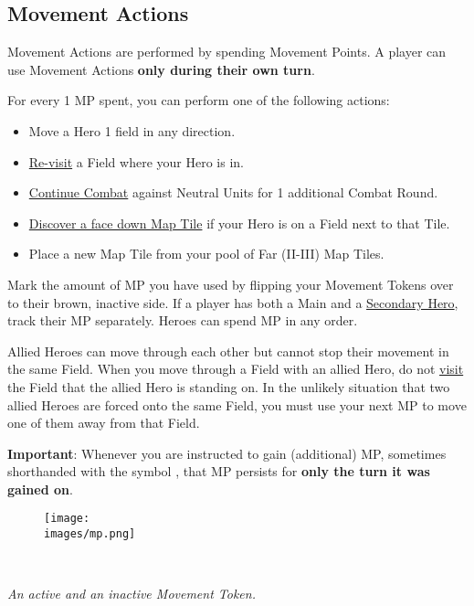 \subsection*{Movement Actions}
Movement Actions are performed by spending Movement Points.
A player can use Movement Actions \textbf{only during their own turn}.\par
For every 1 MP spent, you can perform one of the following actions:
\begin{itemize}
    \item Move a Hero 1 field in any direction.
    \item \hyperlink{Categories}{Re-visit} a Field where your Hero is in.
    \item \hyperlink{Timelimit}{Continue Combat} against Neutral Units for 1 additional Combat Round.
    \item \hyperlink{Placing}{Discover a face down Map Tile} if your Hero is on a Field next to that Tile.
    \item Place a new Map Tile from your pool of Far (II-III) Map Tiles.
\end{itemize}
Mark the amount of MP you have used by flipping your Movement Tokens over to their brown, inactive side.
If a player has both a Main and a \hyperlink{Secondary}{Secondary Hero}, track their MP separately.
Heroes can spend MP in any order.\par
Allied Heroes can move through each other but cannot stop their movement in the same Field.
When you move through a Field with an allied Hero, do not \hyperlink{Categories}{visit} the Field that the allied Hero is standing on.
In the unlikely situation that two allied Heroes are forced onto the same Field, you must use your next MP to move one of them away from that Field.\par
\textbf{Important}: Whenever you are instructed to gain (additional) MP, sometimes shorthanded with the symbol , that MP persists for \textbf{only the turn it was gained on}.
\begin{figure}[h]
\centering
\texttt{[image: \\images/mp.png]}
\end{figure}\\
\begin{center}
\textit{An active and an inactive Movement Token.}
\end{center}

\clearpage

